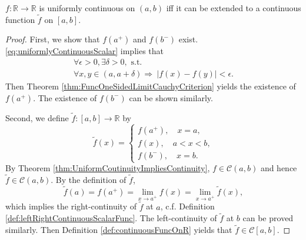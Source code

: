 \begin{lem}
  \label{lem:uniformContExtension}
  $f: \mathbb{R}\rightarrow \mathbb{R}$
  is uniformly continuous on $(a,b)$
  iff it can be extended
  to a continuous function $\tilde{f}$ on $[a,b]$.
\end{lem}
\begin{proof}
  First, we show that $f(a^{+})$ and $f(b^{-})$ exist.
  \eqref{eq:uniformlyContinuousScalar} implies that
  \begin{displaymath}
    \begin{array}{l}
      \forall \epsilon>0, \exists \delta>0,\text{ s.t. }\\
      \forall x,y\in (a,a+\delta) 
      \Rightarrow\ |f(x)-f(y)|<\epsilon.
    \end{array}
  \end{displaymath}
  Then Theorem \ref{thm:FuncOneSidedLimitCauchyCriterion} yields the
  existence of $f(a^{+})$. The existence of $f(b^{-})$ can be shown
  similarly.

  Second, we define $\tilde{f}:[a,b]\rightarrow \mathbb{R}$ by
  \begin{displaymath}
    \tilde{f}(x)=\left\lbrace
      \begin{array}{l}
        f(a^{+}),\quad x=a,\\
        f(x),\quad a<x<b,\\
        f(b^{-}),\quad x=b.
      \end{array}
    \right.
  \end{displaymath}
  By Theorem \ref{thm:UniformCoutinuityImpliesContinuity},
  $f\in \mathcal{C}(a,b)$ and hence $\tilde{f}\in \mathcal{C}(a,b)$.
  By the definition of $\tilde{f}$,
  \begin{displaymath}
    \tilde{f}(a)=f(a^{+})
    =\lim_{x\rightarrow a^{+}}f(x)
    =\lim_{x\rightarrow a^{+}}\tilde{f}(x),
  \end{displaymath}
  which implies the right-continuity of $\tilde{f}$ at $a$,
  c.f. Definition \ref{def:leftRightContinuousScalarFunc}.
  The left-continuity of $\tilde{f}$ at $b$ can be proved similarly.
  Then Definition \ref{def:continuousFuncOnR} yields that
  $\tilde{f}\in \mathcal{C}[a,b]$.
\end{proof}

